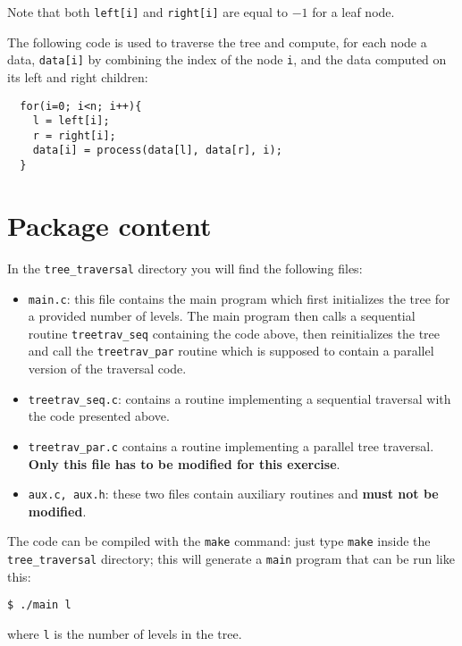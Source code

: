 \documentclass{article}
\begin{document}
Note that both \texttt{left[i]} and \texttt{right[i]} are equal to
$-1$ for a leaf node.

The following code is used to traverse the tree and compute, for each
node a data, \texttt{data[i]} by combining the index of the node
\texttt{i}, and the data computed on its left and right children:

\begin{verbatim}
  for(i=0; i<n; i++){
    l = left[i];
    r = right[i];
    data[i] = process(data[l], data[r], i);
  }
\end{verbatim}



\section{Package content}
In the \texttt{tree\_traversal} directory you will find the
following files:
\begin{itemize}
\item \texttt{main.c}: this file contains the main program which first
  initializes the tree for a provided number of levels. The main
  program then calls a sequential routine \texttt{treetrav\_seq}
  containing the code above, then reinitializes the tree and call the
  \texttt{treetrav\_par} routine which is supposed to contain a
  parallel version of the traversal code.
\item \texttt{treetrav\_seq.c}: contains a routine implementing a
  sequential traversal with the code presented above.
\item \texttt{treetrav\_par.c} contains a routine implementing a
  parallel tree traversal. \textbf{Only this file has to be modified
    for this exercise}.
\item \texttt{aux.c, aux.h}: these two files contain auxiliary
  routines and \textbf{must not be modified}.
\end{itemize}



The code can be compiled with the \texttt{make} command: just type
\texttt{make} inside the \texttt{tree\_traversal} directory; this
will generate a \texttt{main} program that can be run like this:

\begin{verbatim}
$ ./main l
\end{verbatim}

where \texttt{l} is the number of levels in the tree.
\end{document}
